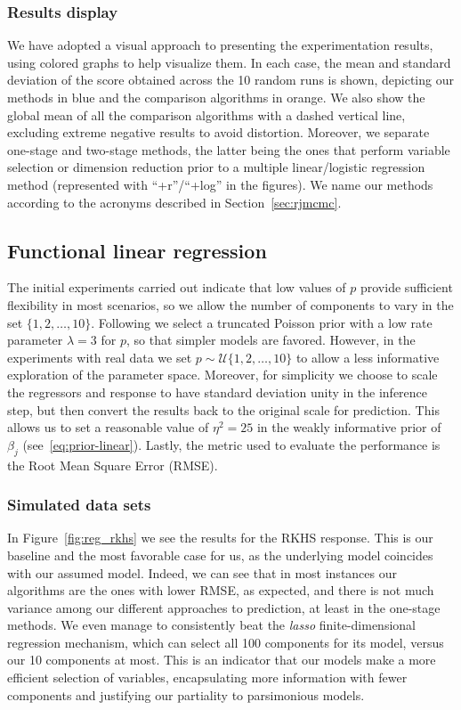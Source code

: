 \documentclass{article}
\numberwithin{equation}{section}
\theoremstyle{plain}
\theoremstyle{definition}
\begin{document}
\subsubsection*{Results display}

We have adopted a visual approach to presenting the experimentation results, using colored graphs to help visualize them. In each case, the mean and standard deviation of the score obtained across the 10 random runs is shown, depicting our methods in blue and the comparison algorithms in orange. We also show the global mean of all the comparison algorithms with a dashed vertical line, excluding extreme negative results to avoid distortion. Moreover, we separate one-stage and two-stage methods, the latter being the ones that perform variable selection or dimension reduction prior to a multiple linear/logistic regression method (represented with ``+r''/``+log'' in the figures). We name our methods according to the acronyms described in Section~\ref{sec:rjmcmc}. 

\subsection{Functional linear regression}\label{sec:experiments-linear}

The initial experiments carried out indicate that low values of \(p\) provide sufficient flexibility in most scenarios, so we allow the number of components to vary in the set \(\{1,2,\dots,10\}\). Following \citet{nobile2007bayesian} we select a truncated Poisson prior with a low rate parameter \(\lambda=3\) for \(p\), so that simpler models are favored. However, in the experiments with real data we set \(p\sim \mathcal U\{1,2,\dots,10\}\) to allow a less informative exploration of the parameter space. Moreover, for simplicity we choose to scale the regressors and response to have standard deviation unity in the inference step, but then convert the results back to the original scale for prediction. This allows us to set a reasonable value of \(\eta^2=25\) in the weakly informative prior of \(\beta_j\) (see~\eqref{eq:prior-linear}). Lastly, the metric used to evaluate the performance is the Root Mean Square Error (RMSE).

\subsubsection*{Simulated data sets}

In Figure~\ref{fig:reg_rkhs} we see the results for the RKHS response. This is our baseline and the most favorable case for us, as the underlying model coincides with our assumed model. Indeed, we can see that in most instances our algorithms are the ones with lower RMSE, as expected, and there is not much variance among our different approaches to prediction, at least in the one-stage methods. We even manage to consistently beat the \textit{lasso} finite-dimensional regression mechanism, which can select all 100 components for its model, versus our 10 components at most. This is an indicator that our models make a more efficient selection of variables, encapsulating more information with fewer components and justifying our partiality to parsimonious models.
\end{document}
